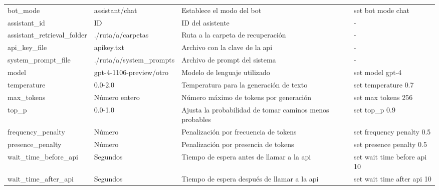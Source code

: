 \begin{table}[htbp]
\begin{tabularx}{\linewidth}{llXl}
    bot\_mode & assistant/chat & Establece el modo del bot  & set bot mode chat \\
    assistant\_id & ID & ID del asistente  & - \\
    assistant\_retrieval\_folder & \textcolor{pathcolor}{./ruta/a/carpetas} & Ruta a la carpeta de recuperación  & - \\
    api\_key\_file & \textcolor{pathcolor}{apikey.txt} & Archivo con la clave de la \gls{api}  & - \\
    system\_prompt\_file & \textcolor{pathcolor}{./ruta/a/system\_prompts} & Archivo de prompt del sistema  & - \\
    model & gpt-4-1106-preview/otro & Modelo de lenguaje utilizado  & set model gpt-4 \\
    temperature & \textcolor{numbercolor}{0.0-2.0} & Temperatura para la generación de texto  & set temperature \textcolor{numbercolor}{0.7} \\
    max\_tokens & \textcolor{numbercolor}{Número entero} & Número máximo de tokens por generación  & set max tokens \textcolor{numbercolor}{256} \\
    top\_p & \textcolor{numbercolor}{0.0-1.0} & Ajusta la probabilidad de tomar caminos menos probables  & set top\_p \textcolor{numbercolor}{0.9} \\
    frequency\_penalty & \textcolor{numbercolor}{Número} & Penalización por frecuencia de tokens  & set frequency penalty \textcolor{numbercolor}{0.5} \\
    presence\_penalty & \textcolor{numbercolor}{Número} & Penalización por presencia de tokens  & set presence penalty \textcolor{numbercolor}{0.5} \\
    wait\_time\_before\_api & \textcolor{numbercolor}{Segundos} & Tiempo de espera antes de llamar a la \gls{api}  & set wait time before api \textcolor{numbercolor}{10} \\
    wait\_time\_after\_api & \textcolor{numbercolor}{Segundos} & Tiempo de espera después de llamar a la \gls{api}  & set wait time after api \textcolor{numbercolor}{10} \\
    \bottomrule
\end{tabularx}
\endgroup
\source{\propio}
\label{table:json_comandos}
\end{table}
    


